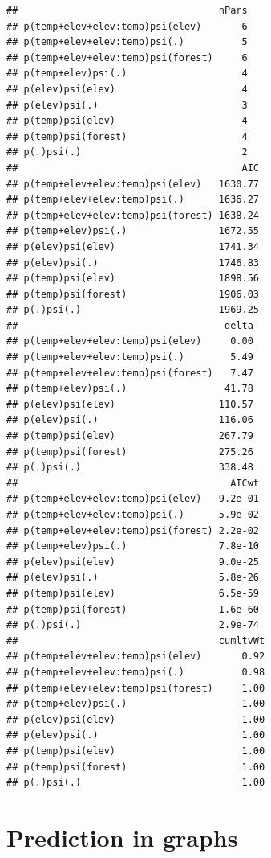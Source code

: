 \documentclass[
]{book}
\begin{document}
\begin{verbatim}
##                                   nPars
## p(temp+elev+elev:temp)psi(elev)       6
## p(temp+elev+elev:temp)psi(.)          5
## p(temp+elev+elev:temp)psi(forest)     6
## p(temp+elev)psi(.)                    4
## p(elev)psi(elev)                      4
## p(elev)psi(.)                         3
## p(temp)psi(elev)                      4
## p(temp)psi(forest)                    4
## p(.)psi(.)                            2
##                                       AIC
## p(temp+elev+elev:temp)psi(elev)   1630.77
## p(temp+elev+elev:temp)psi(.)      1636.27
## p(temp+elev+elev:temp)psi(forest) 1638.24
## p(temp+elev)psi(.)                1672.55
## p(elev)psi(elev)                  1741.34
## p(elev)psi(.)                     1746.83
## p(temp)psi(elev)                  1898.56
## p(temp)psi(forest)                1906.03
## p(.)psi(.)                        1969.25
##                                    delta
## p(temp+elev+elev:temp)psi(elev)     0.00
## p(temp+elev+elev:temp)psi(.)        5.49
## p(temp+elev+elev:temp)psi(forest)   7.47
## p(temp+elev)psi(.)                 41.78
## p(elev)psi(elev)                  110.57
## p(elev)psi(.)                     116.06
## p(temp)psi(elev)                  267.79
## p(temp)psi(forest)                275.26
## p(.)psi(.)                        338.48
##                                     AICwt
## p(temp+elev+elev:temp)psi(elev)   9.2e-01
## p(temp+elev+elev:temp)psi(.)      5.9e-02
## p(temp+elev+elev:temp)psi(forest) 2.2e-02
## p(temp+elev)psi(.)                7.8e-10
## p(elev)psi(elev)                  9.0e-25
## p(elev)psi(.)                     5.8e-26
## p(temp)psi(elev)                  6.5e-59
## p(temp)psi(forest)                1.6e-60
## p(.)psi(.)                        2.9e-74
##                                   cumltvWt
## p(temp+elev+elev:temp)psi(elev)       0.92
## p(temp+elev+elev:temp)psi(.)          0.98
## p(temp+elev+elev:temp)psi(forest)     1.00
## p(temp+elev)psi(.)                    1.00
## p(elev)psi(elev)                      1.00
## p(elev)psi(.)                         1.00
## p(temp)psi(elev)                      1.00
## p(temp)psi(forest)                    1.00
## p(.)psi(.)                            1.00
\end{verbatim}

\hypertarget{prediction-in-graphs}{%
\section{Prediction in graphs}\label{prediction-in-graphs}}
\end{document}

